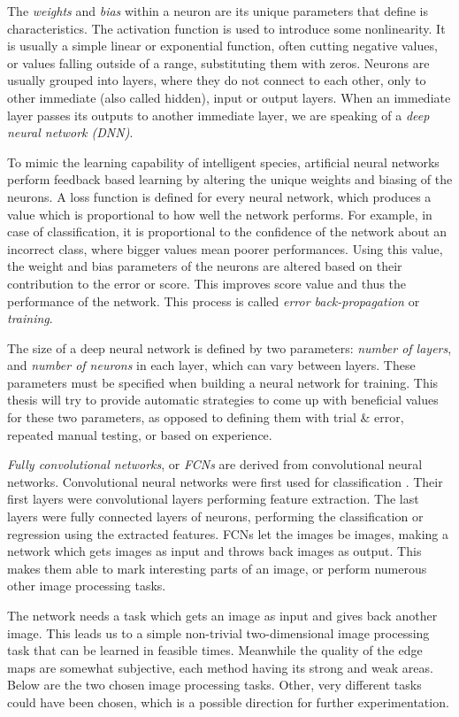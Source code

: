 \documentclass[12pt]{report}
\begin{document}
The \textit{weights} and \textit{bias} within a neuron are its unique parameters that define is characteristics. The activation function is used to introduce some nonlinearity. It is usually a simple linear or exponential function, often cutting negative values, or values falling outside of a range, substituting them with zeros. Neurons are usually grouped into layers, where they do not connect to each other, only to other immediate (also called hidden), input or output layers. When an immediate layer passes its outputs to another immediate layer, we are speaking of a \textit{deep neural network (DNN)}.

To mimic the learning capability of intelligent species, artificial neural networks perform feedback based learning by altering the unique weights and biasing of the neurons. A loss function is defined for every neural network, which produces a value which is proportional to how well the network performs. For example, in case of classification, it is proportional to the confidence of the network about an incorrect class, where bigger values mean poorer performances. Using this value, the weight and bias parameters of the neurons are altered based on their contribution to the error or score. This improves score value and thus the performance of the network. This process is called \textit{error back-propagation} or \textit{training}.

The size of a deep neural network is defined by two parameters: \textit{number of layers}, and \textit{number of neurons} in each layer, which can vary between layers. These parameters must be specified when building a neural network for training. This thesis will try to provide automatic strategies to come up with beneficial values for these two parameters, as opposed to defining them with trial \& error, repeated manual testing, or based on experience.

\textit{Fully convolutional networks}, or \textit{FCNs} are derived from convolutional neural networks. Convolutional neural networks were first used for classification \cite{applications}. Their first layers were convolutional layers performing feature extraction. The last layers were fully connected layers of neurons, performing the classification or regression using the extracted features. FCNs let the images be images, making a network which gets images as input and throws back images as output. This makes them able to mark interesting parts of an image, or perform numerous other image processing tasks.

The network needs a task which gets an image as input and gives back another image. This leads us to a simple non-trivial two-dimensional image processing task that can be learned in feasible times. Meanwhile the quality of the edge maps are somewhat subjective, each method having its strong and weak areas. Below are the two chosen image processing tasks. Other, very different tasks could have been chosen, which is a possible direction for further experimentation.
\end{document}
